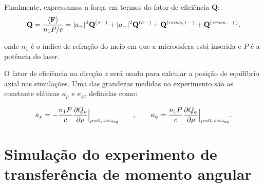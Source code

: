 \documentclass[10pt]{beamer}
\begin{document}
\begin{frame}

    \begin{center}
        Finalmente, expressamos a força em termos do fator de eficiência $\mathbf{Q}$:
        \begin{equation}
        {\mathbf Q} = \frac{\left<{\mathbf F}\right>}{n_1 P/c}= |a_+|^2{\mathbf Q}^{(\sigma +)} + |a_-|^2{\mathbf Q}^{(\sigma -)} + {\mathbf Q}^{({\it cross},+-)} + {\mathbf Q}^{({\it cross},-+)}.
        \end{equation}
        
        onde $n_1$ é o índice de refração do meio em que a microesfera está inserida e $P$ é a potência do laser.

        O fator de eficiência na direção $z$ será usado para calcular a posição de equilíbrio axial nas simulações. Uma das grandezas medidas no experimento são as constante eláticas $\kappa_\rho$ e $\kappa_\phi$, definidas como:

        \begin{equation}
        \kappa_\rho=-\frac{n_1 P}{c}\frac{\partial Q_\rho}{\partial \rho}\Big{|}_{\rho=0, \thinspace z=z_{eq}} \qquad, \qquad \kappa_\phi=\frac{n_1 P}{c}\frac{\partial Q_\phi}{\partial \rho}\Big{|}_{\rho=0, \thinspace z=z_{eq}}.
        \end{equation}
%
    \end{center}

\end{frame}


\section{Simulação do experimento de transferência de momento angular}

\end{document}
